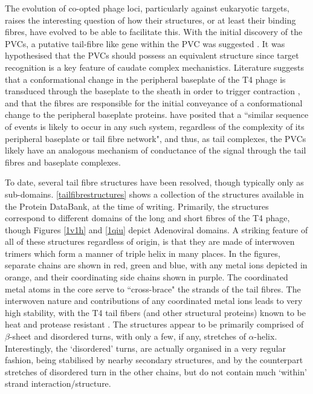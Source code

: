 The evolution of co-opted phage loci, particularly against eukaryotic targets, raises the interesting question of how their structures, or at least their binding fibres, have evolved to be able to facilitate this. With the initial discovery of the PVCs, a putative tail-fibre like gene within the PVC was suggested \citep{Yang2006}. It was hypothesised that the PVCs should possess an equivalent structure since target recognition is a key feature of caudate complex mechanistics. Literature suggests that a conformational change in the peripheral baseplate of the T4 phage is transduced through the baseplate to the sheath in order to trigger contraction \citep{Taylor2016}, and that the fibres are responsible for the initial conveyance of a conformational change to the peripheral baseplate proteins. \cite{Taylor2016} have posited that a ``similar sequence of events is likely to occur in any such system, regardless of the complexity of its peripheral baseplate or tail fibre network", and thus, as tail complexes, the PVCs likely have an analogous mechanism of conductance of the signal through the tail fibres and baseplate complexes.

To date, several tail fibre structures have been resolved, though typically only as sub-domains. \vref{tailfibrestructures} shows a collection of the structures available in the Protein DataBank, at the time of writing. Primarily, the structures correspond to different domains of the long and short fibres of the T4 phage, though Figures \ref{1v1h} and \ref{1qiu} depict Adenoviral domains. A striking feature of all of these structures regardless of origin, is that they are made of interwoven trimers which form a manner of triple helix in many places. In the figures, separate chains are shown in red, green and blue, with any metal ions depicted in orange, and their coordinating side chains shown in purple. The coordinated metal atoms in the core serve to ``cross-brace" the strands of the tail fibres. The interwoven nature and contributions of any coordinated metal ions leads to very high stability, with the T4 tail fibers (and other structural proteins) known to be heat and protease resistant \citep{Bartual2010, Granell2014}. The structures appear to be primarily comprised of $\beta$-sheet and disordered turns, with only a few, if any, stretches of $\alpha$-helix. Interestingly, the `disordered' turns, are actually organised in a very regular fashion, being stabilised by nearby secondary structures, and by the counterpart stretches of disordered turn in the other chains, but do not contain much `within' strand interaction/structure.

